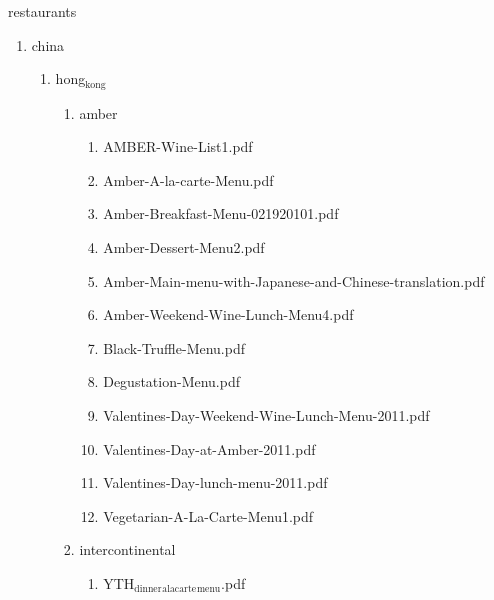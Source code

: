 \documentclass[11pt]{article}
\begin{document}
\item restaurants
\label{sec-1-1-1-1-21-10}
\begin{enumerate}
\item china
\label{sec-1-1-1-1-21-10-1}
\begin{enumerate}
\item hong$_{\text{kong}}$
\label{sec-1-1-1-1-21-10-1-1}
\begin{enumerate}
\item amber
\label{sec-1-1-1-1-21-10-1-1-1}
\begin{enumerate}
\item AMBER-Wine-List1.pdf
\label{sec-1-1-1-1-21-10-1-1-1-1}

\item Amber-A-la-carte-Menu.pdf
\label{sec-1-1-1-1-21-10-1-1-1-2}

\item Amber-Breakfast-Menu-021920101.pdf
\label{sec-1-1-1-1-21-10-1-1-1-3}

\item Amber-Dessert-Menu2.pdf
\label{sec-1-1-1-1-21-10-1-1-1-4}

\item Amber-Main-menu-with-Japanese-and-Chinese-translation.pdf
\label{sec-1-1-1-1-21-10-1-1-1-5}

\item Amber-Weekend-Wine-Lunch-Menu4.pdf
\label{sec-1-1-1-1-21-10-1-1-1-6}

\item Black-Truffle-Menu.pdf
\label{sec-1-1-1-1-21-10-1-1-1-7}

\item Degustation-Menu.pdf
\label{sec-1-1-1-1-21-10-1-1-1-8}

\item Valentines-Day-Weekend-Wine-Lunch-Menu-2011.pdf
\label{sec-1-1-1-1-21-10-1-1-1-9}

\item Valentines-Day-at-Amber-2011.pdf
\label{sec-1-1-1-1-21-10-1-1-1-10}

\item Valentines-Day-lunch-menu-2011.pdf
\label{sec-1-1-1-1-21-10-1-1-1-11}

\item Vegetarian-A-La-Carte-Menu1.pdf
\label{sec-1-1-1-1-21-10-1-1-1-12}
\end{enumerate}

\item intercontinental
\label{sec-1-1-1-1-21-10-1-1-2}
\begin{enumerate}
\item YTH$_{\text{dinner}}$$_{\text{alacarte}}$$_{\text{menu}}$.pdf
\label{sec-1-1-1-1-21-10-1-1-2-1}


\end{enumerate}
\end{enumerate}
\end{enumerate}
\end{enumerate}
\end{document}
